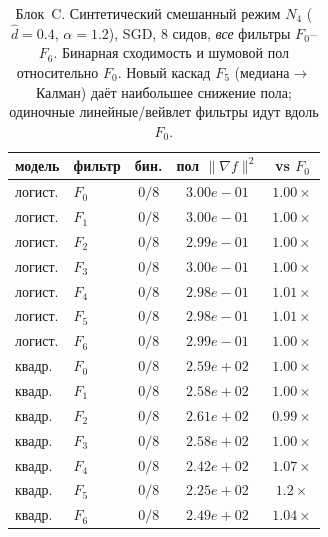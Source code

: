 \begin{table}[t]
\caption{Блок~C. Синтетический смешанный режим $N_4$ ($\hat d{=}0.4$, $\alpha{=}1.2$), SGD, $8$ сидов, \emph{все} фильтры $F_0$--$F_6$. Бинарная сходимость и шумовой пол относительно $F_0$. Новый каскад $F_5$ (медиана$\to$Калман) даёт наибольшее снижение пола; одиночные линейные/вейвлет фильтры идут вдоль $F_0$.}
\label{tab:blockC}
\centering\begin{tabular}{llccc}
\toprule
модель & фильтр & бин. & пол $\|\nabla f\|^2$ & vs $F_0$\\
\midrule
логист. & $F_0$ & $0/8$ & $3.00e-01$ & $1.00\times$\\
логист. & $F_1$ & $0/8$ & $3.00e-01$ & $1.00\times$\\
логист. & $F_2$ & $0/8$ & $2.99e-01$ & $1.00\times$\\
логист. & $F_3$ & $0/8$ & $3.00e-01$ & $1.00\times$\\
логист. & $F_4$ & $0/8$ & $2.98e-01$ & $1.01\times$\\
логист. & $F_5$ & $0/8$ & $2.98e-01$ & $1.01\times$\\
логист. & $F_6$ & $0/8$ & $2.99e-01$ & $1.00\times$\\
\midrule
квадр. & $F_0$ & $0/8$ & $2.59e+02$ & $1.00\times$\\
квадр. & $F_1$ & $0/8$ & $2.58e+02$ & $1.00\times$\\
квадр. & $F_2$ & $0/8$ & $2.61e+02$ & $0.99\times$\\
квадр. & $F_3$ & $0/8$ & $2.58e+02$ & $1.00\times$\\
квадр. & $F_4$ & $0/8$ & $2.42e+02$ & $1.07\times$\\
квадр. & $F_5$ & $0/8$ & $2.25e+02$ & $\mathbf{1.2\times}$\\
квадр. & $F_6$ & $0/8$ & $2.49e+02$ & $1.04\times$\\
\bottomrule\end{tabular}\end{table}
